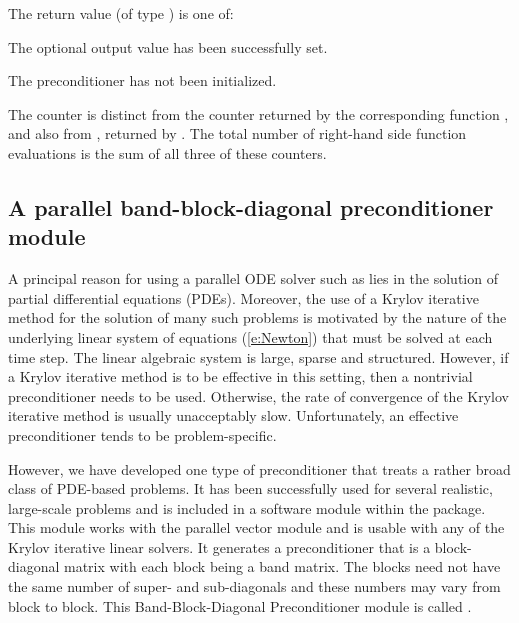 {
  The return value  (of type ) is one of:
  \begin{args}
  \item[\Id{CVSPILS\_SUCCESS}] 
    The optional output value has been successfully set.
  \item[\Id{CVSPILS\_PMEM\_NULL}]
    The {\cvbandpre} preconditioner has not been initialized.
  \end{args}
}
{
The counter  is distinct from the counter 
returned by the corresponding function , and
also from , returned by .
The total number of right-hand side function evaluations is the
sum of all three of these counters.
}

\subsection{A parallel band-block-diagonal preconditioner module}
\label{sss:cvbbdpre}

A principal reason for using a parallel ODE solver such as {\cvodes} lies
in the solution of partial differential equations (PDEs).  Moreover,
the use of a Krylov iterative method for the solution of many such
problems is motivated by the nature of the underlying linear system of
equations (\ref{e:Newton}) that must be solved at each time step.  The
linear algebraic system is large, sparse and structured. However, if
a Krylov iterative method is to be effective in this setting, then a
nontrivial preconditioner needs to be used.  Otherwise, the rate of
convergence of the Krylov iterative method is usually unacceptably
slow.  Unfortunately, an effective preconditioner tends to be
problem-specific.

However, we have developed one type of preconditioner that treats a
rather broad class of PDE-based problems.  It has been successfully
used for several realistic, large-scale problems \cite{HiTa:98} and is
included in a software module within the {\cvodes} package. This module
works with the parallel vector module {\nvecp} and is usable with any of
the Krylov iterative linear solvers.  It generates a preconditioner
that is a block-diagonal matrix with each block being a band matrix.
The blocks need not have the same number of super- and sub-diagonals
and these numbers may vary from block to block. This Band-Block-Diagonal
Preconditioner module is called {\cvbbdpre}.

